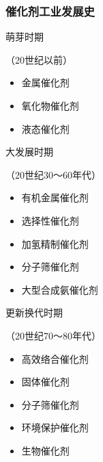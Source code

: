 \documentclass[dvipsnames, svgnames, x11names]{beamer}
\begin{document}
\begin{frame}
    \frametitle{催化剂工业发展史}
    \begin{minipage}{0.32\linewidth}
        \begin{center}
            萌芽时期
        
        （20世纪以前）
        \end{center}
        
        \begin{itemize}
          \item 金属催化剂
          \item 氧化物催化剂
          \item 液态催化剂
        \end{itemize}

        \bigskip

        \bigskip

        \bigskip
    \end{minipage}\hfill
    \begin{minipage}{0.33\linewidth}
        \begin{center}
            大发展时期
        
        （20世纪30～60年代）
        \end{center}
        
        \begin{itemize}
          \item 有机金属催化剂
          \item 选择性催化剂
          \item 加氢精制催化剂
          \item 分子筛催化剂
          \item 大型合成氨催化剂
        \end{itemize}
    \end{minipage}\hfill
    \begin{minipage}{0.32\linewidth}
        \begin{center}
            更新换代时期
        
        （20世纪70～80年代）
        \end{center}
        
        \begin{itemize}
          \item 高效络合催化剂
          \item 固体催化剂
          \item 分子筛催化剂
          \item 环境保护催化剂
          \item 生物催化剂
        \end{itemize}
    \end{minipage}
\end{frame}
\end{document}

